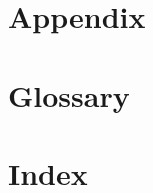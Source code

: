 \renewcommand\refname{\section{References}}{\vspace*{-12mm}}



\section{Appendix}

\section{Glossary}

\section{Index}

